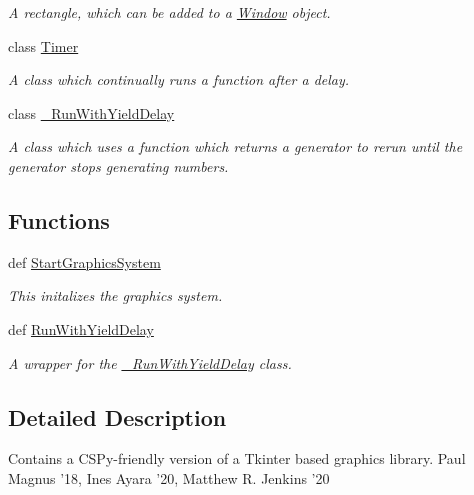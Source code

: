 \begin{DoxyCompactItemize}
\begin{DoxyCompactList}\small\item\em A rectangle, which can be added to a \hyperlink{classcs110graphics_1_1Window}{Window} object. \item\end{DoxyCompactList}\item 
class \hyperlink{classcs110graphics_1_1Timer}{Timer}
\begin{DoxyCompactList}\small\item\em A class which continually runs a function after a delay. \item\end{DoxyCompactList}\item 
class \hyperlink{classcs110graphics_1_1__RunWithYieldDelay}{\_\-RunWithYieldDelay}
\begin{DoxyCompactList}\small\item\em A class which uses a function which returns a generator to rerun until the generator stops generating numbers. \item\end{DoxyCompactList}\end{DoxyCompactItemize}
\subsection*{Functions}
\begin{DoxyCompactItemize}
\item 
def \hyperlink{namespacecs110graphics_af1a7cabc9d0dea87259e97ad88ef85ac}{StartGraphicsSystem}
\begin{DoxyCompactList}\small\item\em This initalizes the graphics system. \item\end{DoxyCompactList}\item 
def \hyperlink{namespacecs110graphics_a0715c42bb0e296007b96bd0a20903d16}{RunWithYieldDelay}
\begin{DoxyCompactList}\small\item\em A wrapper for the \hyperlink{classcs110graphics_1_1__RunWithYieldDelay}{\_\-RunWithYieldDelay} class. \item\end{DoxyCompactList}\end{DoxyCompactItemize}


\subsection{Detailed Description}
Contains a CSPy-\/friendly version of a Tkinter based graphics library. Paul Magnus '18, Ines Ayara '20, Matthew R. Jenkins '20

